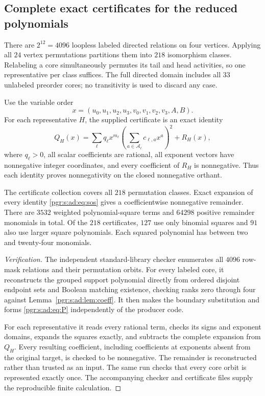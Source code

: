 \documentclass[11pt]{article}
\numberwithin{equation}{section}
\theoremstyle{definition}\newtheorem{definition}[theorem]{Definition}\newtheorem{remark}[theorem]{Remark}
\begin{document}
\subsection{Complete exact certificates for the reduced polynomials}
There are $2^{12}=4096$ loopless labeled directed relations on four vertices. Applying all $24$ vertex permutations partitions them into $218$ isomorphism classes. Relabeling a core simultaneously permutes its tail and head activities, so one representative per class suffices. The full directed domain includes all $33$ unlabeled preorder cores; no transitivity is used to discard any case.

Use the variable order
\[
 x=(u_0,u_1,u_2,u_3,v_0,v_1,v_2,v_3,A,B).
\]
For each representative $H$, the supplied certificate is an exact identity
\begin{equation}\label{pgr:s:ad:eq:sos}
 Q_H(x)=\sum_{\ell}q_\ell x^{m_\ell}
             \left(\sum_{a\in\mathcal A_\ell}c_{\ell,a}x^a\right)^2+R_H(x),
\end{equation}
where $q_\ell>0$, all scalar coefficients are rational, all exponent vectors have nonnegative integer coordinates, and every coefficient of $R_H$ is nonnegative. Thus each identity proves nonnegativity on the closed nonnegative orthant.

\begin{proposition}\label{pgr:s:ad:prop:cert}
The certificate collection covers all $218$ permutation classes. Exact expansion of every identity \eqref{pgr:s:ad:eq:sos} gives a coefficientwise nonnegative remainder. There are $3532$ weighted polynomial-square terms and $64298$ positive remainder monomials in total. Of the $218$ certificates, $127$ use only binomial squares and $91$ also use larger square polynomials. Each squared polynomial has between two and twenty-four monomials.
\end{proposition}
\begin{proof}[Verification]
The independent standard-library checker enumerates all $4096$ row-mask relations and their permutation orbits. For every labeled core, it reconstructs the grouped support polynomial directly from ordered disjoint endpoint sets and Boolean matching existence, checking ranks zero through four against Lemma~\ref{pgr:s:ad:lem:coeff}. It then makes the boundary substitution and forms \eqref{pgr:s:ad:eq:P} independently of the producer code.

For each representative it reads every rational term, checks its signs and exponent domains, expands the squares exactly, and subtracts the complete expansion from $Q_H$. Every resulting coefficient, including coefficients at exponents absent from the original target, is checked to be nonnegative. The remainder is reconstructed rather than trusted as an input. The same run checks that every core orbit is represented exactly once. The accompanying checker and certificate files supply the reproducible finite calculation.
\end{proof}
\end{document}
